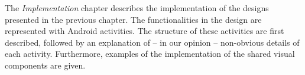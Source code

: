 The \emph{Implementation} chapter describes the implementation of the designs presented in the previous chapter.
The functionalities in the design are represented with Android activities. 
The structure of these activities are first described, followed by an explanation of -- in our opinion -- non-obvious details of each activity.
Furthermore, examples of the implementation of the shared visual components are given.